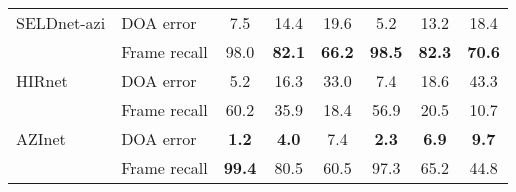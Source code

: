 \documentclass[journal]{IEEEtran}
\begin{document}
\begin{table}[!tp]
{\begin{tabular}{l|l|ccc|ccc}
SELDnet-azi & DOA error & 7.5 & 14.4 & 19.6 & 5.2 & 13.2 & 18.4 \\
 & Frame recall & 98.0 &\bf 82.1 & \bf66.2  &\bf 98.5 & \bf82.3 &\bf 70.6\\\cline{2-8}
HIRnet~\cite{Hirvonen2015} & DOA error & 5.2 & 16.3  & 33.0 & 7.4 & 18.6 & 43.3 \\
 & Frame recall & 60.2 & 35.9 & 18.4  & 56.9 & 20.5 & 10.7 \\\cline{2-8}
AZInet~\cite{Chakrabarty2017_nips} & DOA error & \bf1.2 & \bf4.0 & 7.4&\bf 2.3 & \bf6.9 & \bf9.7 \\
 & Frame recall & \bf99.4 & 80.5 & 60.5 & 97.3 & 65.2 & 44.8 
\end{tabular}
}
\end{table}

\end{document}
